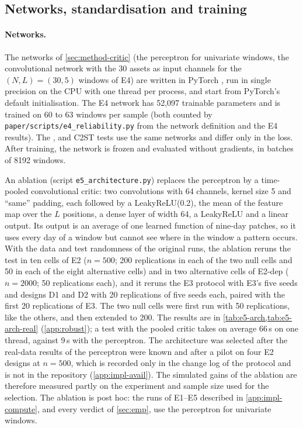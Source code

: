 \subsection{Networks, standardisation and training}\label{app:impl-nets}

\paragraph{Networks.}
The networks of \cref{sec:method-critic} (the perceptron for univariate windows, the
convolutional network with the 30 assets as input channels for the $(N,L)=(30,5)$ windows of
E4) are written in PyTorch \citep{paszke_2019_pytorch}, run in single precision on the CPU with
one thread per process, and start from PyTorch's default initialisation. The E4 network has
52{,}097 trainable parameters and is trained on 60 to 63 windows per sample (both counted by
\texttt{paper/scripts/e4\_reliability.py} from the network definition and the E4 results). The \WC{}, \LRC{} and
C2ST tests use the same networks and differ only in the loss. After training, the network is
frozen and evaluated without gradients, in batches of 8192 windows.

An ablation (script \texttt{e5\_architecture.py}) replaces the perceptron by a time-pooled
convolutional critic: two convolutions with 64 channels, kernel size 5 and ``same'' padding,
each followed by a LeakyReLU(0.2), the mean of the feature map over the $L$ positions, a dense
layer of width 64, a LeakyReLU and a linear output. Its output is an average of one learned
function of nine-day patches, so it uses every day of a window but cannot see where in the
window a pattern occurs. With the data and test randomness of the original runs, the ablation
reruns the \WC{} test in ten cells of E2 ($n=500$; 200 replications in each of the two null
cells and 50 in each of the eight alternative cells) and in two alternative cells of E2-dep
($n=2000$; 50 replications each), and it reruns the E3 protocol with E3's five seeds and designs
D1 and D2 with 20 replications of five seeds each, paired with the first 20 replications of E3.
The two null cells were first run with 50 replications, like the others, and then extended to
200. The results are in \cref{tab:e5-arch,tab:e5-arch-real} (\cref{app:robust}); a test with
the pooled critic takes on average 66\,s on one thread, against 9\,s with the perceptron. The
architecture was selected after the real-data results of the perceptron were known and after a
pilot on four E2 designs at $n=500$, which is recorded only in the change log of the protocol
and is not in the repository (\cref{app:impl-avail}). The simulated gains of the ablation are
therefore measured partly on the experiment and sample size used for the selection. The
ablation is post hoc: the runs of E1--E5 described in \cref{app:impl-compute}, and every verdict
of \cref{sec:emp}, use the perceptron for univariate windows.

